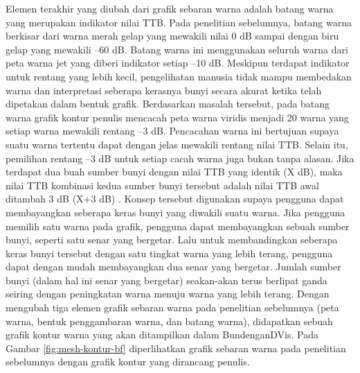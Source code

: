 Elemen terakhir yang diubah dari grafik sebaran warna adalah batang warna yang merupakan indikator nilai TTB. Pada penelitian sebelumnya, batang warna berkisar dari warna merah gelap yang mewakili nilai 0 dB sampai dengan biru gelap yang mewakili –60 dB. Batang warna ini menggunakan seluruh warna dari peta warna jet yang diberi indikator setiap –10 dB. Meskipun terdapat indikator untuk rentang yang lebih kecil, pengelihatan manusia tidak mampu membedakan warna dan interpretasi seberapa kerasnya bunyi secara akurat ketika telah dipetakan dalam bentuk grafik. Berdasarkan masalah tersebut, pada batang warna grafik kontur penulis mencacah peta warna viridis menjadi 20 warna yang setiap warna mewakili rentang –3 dB. Pencacahan warna ini bertujuan supaya suatu warna tertentu dapat dengan jelas mewakili rentang nilai TTB. Selain itu, pemilihan rentang –3 dB untuk setiap cacah warna juga bukan tanpa alasan. Jika terdapat dua buah sumber bunyi dengan nilai TTB yang identik (X dB), maka nilai TTB kombinasi kedua sumber bunyi tersebut adalah nilai TTB awal ditambah 3 dB (X+3 dB) \cite{kinsler}. Konsep tersebut digunakan supaya pengguna dapat membayangkan seberapa keras bunyi yang diwakili suatu warna. Jika pengguna memilih satu warna pada grafik, pengguna dapat membayangkan sebuah sumber bunyi, seperti satu senar yang bergetar. Lalu untuk membandingkan seberapa keras bunyi tersebut dengan satu tingkat warna yang lebih terang, pengguna dapat dengan mudah membayangkan dua senar yang bergetar. Jumlah sumber bunyi (dalam hal ini senar yang bergetar) seakan-akan terus berlipat ganda seiring dengan peningkatan warna menuju warna yang lebih terang. Dengan mengubah tiga elemen grafik sebaran warna pada penelitian sebelumnya (peta warna, bentuk penggambaran warna, dan batang warna), didapatkan sebuah grafik kontur warna yang akan ditampilkan dalam BundenganDVis. Pada Gambar \ref{fig:mesh-kontur-bf} diperlihatkan grafik sebaran warna pada penelitian sebelumnya dengan grafik kontur yang dirancang penulis. \par 

